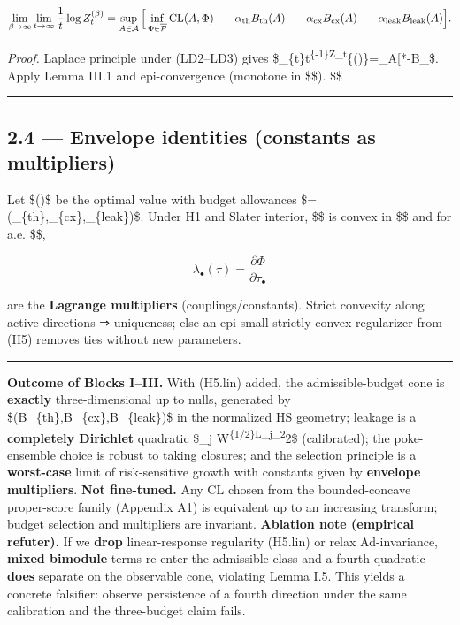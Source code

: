 \documentclass[
]{article}
\numberwithin{equation}{section}
\begin{document}
\[
\lim_{\beta\to\infty}\lim_{t\to\infty}\frac1t\log Z_t^{(\beta)}
= \sup_{A\in\mathcal A}\Big[\inf_{\Phi\in\overline{\mathcal P}}\mathrm{CL}(A,\Phi)\ -\ \alpha_{\rm th}B_{\rm th}(A)\ -\ \alpha_{\rm cx}B_{\rm cx}(A)\ -\ \alpha_{\rm leak}B_{\rm leak}(A)\Big].
\]

\emph{Proof.} Laplace principle under (LD2--LD3) gives
\$\lim\_\{t\to\infty\}t\textsuperscript{\{-1\}\log Z\_t}\{(\beta)\}=\sup\_A{[}*\beta-\sum\alpha*\bullet B\_\bullet{]}\$.
Apply Lemma III.1 and epi-convergence (monotone in \$\beta\$).
\$\square\$

\begin{center}\rule{0.5\linewidth}{0.5pt}\end{center}

\hypertarget{envelope-identities-constants-as-multipliers}{%
\subsection{2.4 --- Envelope identities (constants as
multipliers)}\label{envelope-identities-constants-as-multipliers}}

Let \$\Phi(\tau)\$ be the optimal value with budget allowances
\$\tau=(\tau\_\{\rm th\},\tau\_\{\rm cx\},\tau\_\{\rm leak\})\$. Under
H1 and Slater interior, \$\Phi\$ is convex in \$\tau\$ and for a.e.
\$\tau\$,

\[
\lambda_\bullet(\tau)=\frac{\partial\Phi}{\partial\tau_\bullet}
\]

are the \textbf{Lagrange multipliers} (couplings/constants). Strict
convexity along active directions ⇒ uniqueness; else an epi-small
strictly convex regularizer from (H5) removes ties without new
parameters.

\begin{center}\rule{0.5\linewidth}{0.5pt}\end{center}

\textbf{Outcome of Blocks I--III.} With (H5.lin) added, the
admissible-budget cone is \textbf{exactly} three-dimensional up to
nulls, generated by \$(B\_\{\rm th\},B\_\{\rm cx\},B\_\{\rm leak\})\$ in
the normalized HS geometry; leakage is a \textbf{completely Dirichlet}
quadratic \$\sum\_j
\textbar W\textsuperscript{\{1/2\}L\_j\textbar\_2}2\$ (calibrated); the
poke-ensemble choice is robust to taking closures; and the selection
principle is a \textbf{worst-case} limit of risk-sensitive growth with
constants given by \textbf{envelope multipliers}. \textbf{Not
fine-tuned.} Any CL chosen from the bounded-concave proper-score family
(Appendix A1) is equivalent up to an increasing transform; budget
selection and multipliers are invariant. \textbf{Ablation note
(empirical refuter).} If we \textbf{drop} linear-response regularity
(H5.lin) or relax Ad-invariance, \textbf{mixed bimodule} terms re-enter
the admissible class and a fourth quadratic \textbf{does} separate on
the observable cone, violating Lemma I.5. This yields a concrete
falsifier: observe persistence of a fourth direction under the same
calibration and the three-budget claim fails.
\end{document}
